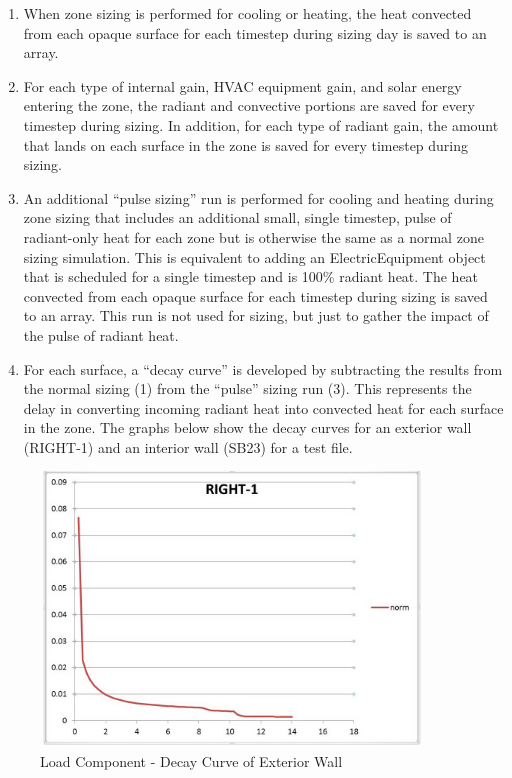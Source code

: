 \begin{enumerate}
\def\labelenumi{\arabic{enumi})}
\item
  When zone sizing is performed for cooling or heating, the heat convected from each opaque surface for each timestep during sizing day is saved to an array.
\item
  For each type of internal gain, HVAC equipment gain, and solar energy entering the zone, the radiant and convective portions are saved for every timestep during sizing. In addition, for each type of radiant gain, the amount that lands on each surface in the zone is saved for every timestep during sizing.
\item
  An additional ``pulse sizing'' run is performed for cooling and heating during zone sizing that includes an additional small, single timestep, pulse of radiant-only heat for each zone but is otherwise the same as a normal zone sizing simulation. This is equivalent to adding an ElectricEquipment object that is scheduled for a single timestep and is 100\% radiant heat. The heat convected from each opaque surface for each timestep during sizing is saved to an array. This run is not used for sizing, but just to gather the impact of the pulse of radiant heat.
\item
  For each surface, a ``decay curve'' is developed by subtracting the results from the normal sizing (1) from the ``pulse'' sizing run (3). This represents the delay in converting incoming radiant heat into convected heat for each surface in the zone. The graphs below show the decay curves for an exterior wall (RIGHT-1) and an interior wall (SB23) for a test file.
\end{enumerate}

\begin{figure}[hbtp] %
\centering
\includegraphics[width=0.9\textwidth, height=0.9\textheight, keepaspectratio=true]{media/image7912.png}
\caption{Load Component - Decay Curve of Exterior Wall \protect \label{fig:load-component-decay-curve-of-exterior-wall}}
\end{figure}

